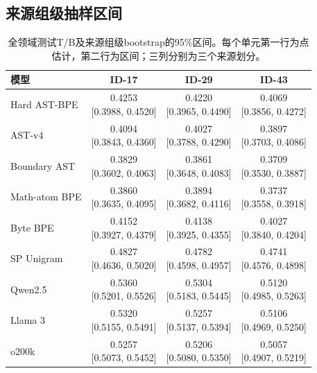 \subsection{来源组级抽样区间}\begin{table}[htbp]\centering\small\caption{全领域测试T/B及来源组级bootstrap的95\%区间。每个单元第一行为点估计，第二行为区间；三列分别为三个来源划分。}\begin{tabular}{lccc}\toprule 模型&ID-17&ID-29&ID-43\\\midrule
Hard AST-BPE & \shortstack{0.4253\\{}[0.3988, 0.4520]} & \shortstack{0.4220\\{}[0.3965, 0.4490]} & \shortstack{0.4069\\{}[0.3856, 0.4272]} \\
AST-v4 & \shortstack{0.4094\\{}[0.3843, 0.4360]} & \shortstack{0.4027\\{}[0.3788, 0.4290]} & \shortstack{0.3897\\{}[0.3703, 0.4086]} \\
Boundary AST & \shortstack{0.3829\\{}[0.3602, 0.4063]} & \shortstack{0.3861\\{}[0.3648, 0.4083]} & \shortstack{0.3709\\{}[0.3530, 0.3887]} \\
Math-atom BPE & \shortstack{0.3860\\{}[0.3635, 0.4095]} & \shortstack{0.3894\\{}[0.3682, 0.4116]} & \shortstack{0.3737\\{}[0.3558, 0.3918]} \\
Byte BPE & \shortstack{0.4152\\{}[0.3927, 0.4379]} & \shortstack{0.4138\\{}[0.3925, 0.4355]} & \shortstack{0.4027\\{}[0.3840, 0.4204]} \\
SP Unigram & \shortstack{0.4827\\{}[0.4636, 0.5020]} & \shortstack{0.4782\\{}[0.4598, 0.4957]} & \shortstack{0.4741\\{}[0.4576, 0.4898]} \\
Qwen2.5 & \shortstack{0.5360\\{}[0.5201, 0.5526]} & \shortstack{0.5304\\{}[0.5183, 0.5445]} & \shortstack{0.5120\\{}[0.4985, 0.5263]} \\
Llama 3 & \shortstack{0.5320\\{}[0.5155, 0.5491]} & \shortstack{0.5257\\{}[0.5137, 0.5394]} & \shortstack{0.5106\\{}[0.4969, 0.5250]} \\
o200k & \shortstack{0.5257\\{}[0.5073, 0.5452]} & \shortstack{0.5206\\{}[0.5080, 0.5350]} & \shortstack{0.5057\\{}[0.4907, 0.5219]} \\
\bottomrule\end{tabular}\end{table}
